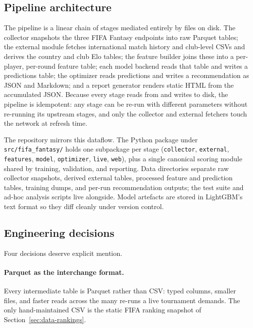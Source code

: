 \subsection{Pipeline architecture}
\label{sec:implementation-pipeline}

The pipeline is a linear chain of stages mediated entirely by files
on disk. The collector snapshots the three FIFA Fantasy endpoints
into raw Parquet tables; the external module fetches international
match history and club-level CSVs and derives the country and club
Elo tables; the feature builder joins these into a per-player,
per-round feature table; each model backend reads that table and
writes a predictions table; the optimizer reads predictions and
writes a recommendation as JSON and Markdown; and a report generator
renders static HTML from the accumulated JSON. Because every stage
reads from and writes to disk, the pipeline is idempotent: any stage
can be re-run with different parameters without re-running its
upstream stages, and only the collector and external fetchers touch
the network at refresh time.

The repository mirrors this dataflow. The Python package under
\texttt{src/fifa\_fantasy/} holds one subpackage per stage
(\texttt{collector}, \texttt{external}, \texttt{features},
\texttt{model}, \texttt{optimizer}, \texttt{live}, \texttt{web}),
plus a single canonical scoring module shared by training,
validation, and reporting. Data directories separate raw collector
snapshots, derived external tables, processed feature and prediction
tables, training dumps, and per-run recommendation outputs; the test
suite and ad-hoc analysis scripts live alongside. Model artefacts
are stored in LightGBM's text format so they diff cleanly under
version control.

\subsection{Engineering decisions}
\label{sec:implementation-engineering}

Four decisions deserve explicit mention.

\paragraph{Parquet as the interchange format.}
Every intermediate table is Parquet rather than CSV: typed columns,
smaller files, and faster reads across the many re-runs a live
tournament demands. The only hand-maintained CSV is the static FIFA
ranking snapshot of Section~\ref{sec:data-rankings}.

